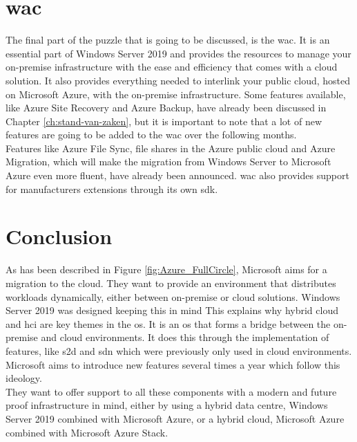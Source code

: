 \section{\acrfull{wac}}
The final part of the puzzle that is going to be discussed, is the \acrlong{wac}. 
It is an essential part of Windows Server 2019 and provides the resources to manage your on-premise infrastructure with the ease and efficiency that comes with a cloud solution. 
It also provides everything needed to interlink your public cloud, hosted on Microsoft Azure, with the on-premise infrastructure. 
Some features available, like Azure Site Recovery and Azure Backup, have already been discussed in Chapter \ref{ch:stand-van-zaken}, but it is important to note that a lot of new features are going to be added to the \acrlong{wac} over the following months. \autocite{Singh2019} 
\\
Features like Azure File Sync, file shares in the Azure public cloud and Azure Migration, which will make the migration from Windows Server to Microsoft Azure even more fluent, have already been announced. 
\acrlong{wac} also provides support for manufacturers extensions through its own \acrfull{sdk}. 	

\section{Conclusion}
As has been described in Figure \ref{fig:Azure_FullCircle}, Microsoft aims for a migration to the cloud. 
They want to provide an environment that distributes workloads dynamically, either between on-premise or cloud solutions. 
Windows Server 2019 was designed keeping this in mind
This explains why hybrid cloud and \acrshort{hci} are key themes in the \acrshort{os}. 
It is an \acrshort{os} that forms a bridge between the on-premise and cloud environments. 
It does this through the implementation of features, like \acrfull{s2d} and \acrfull{sdn} which were previously only used in cloud environments. 
Microsoft aims to introduce new features several times a year which follow this ideology.
\\
They want to offer support to all these components with a modern and future proof infrastructure in mind, either by using a hybrid data centre, Windows Server 2019 combined with Microsoft Azure, or a hybrid cloud, Microsoft Azure combined with Microsoft Azure Stack.